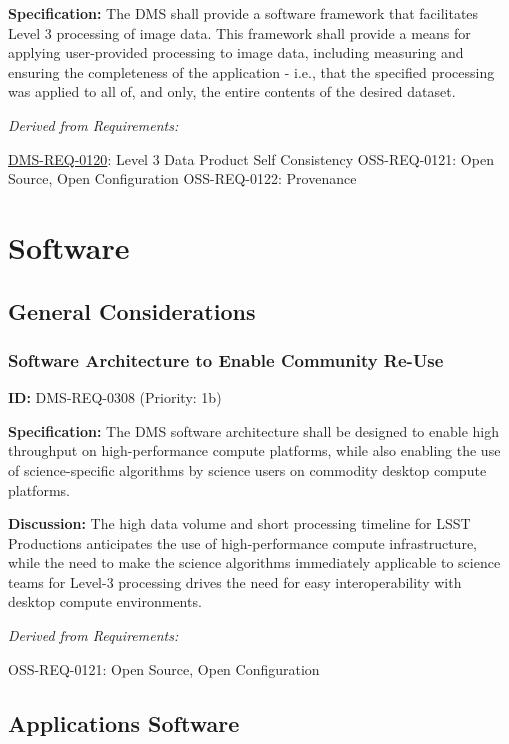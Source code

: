 \documentclass[SE,toc,lsstdraft]{lsstdoc}
\begin{document}
\textbf{Specification:} The DMS shall provide a software framework that facilitates Level 3 processing of image data.  This framework shall provide a means for applying user-provided processing to image data, including measuring and ensuring the completeness of the application - i.e., that the specified processing was applied to all of, and only, the entire contents of the desired dataset.

\emph{Derived from Requirements:}

\hyperref[DMS-REQ-0120]{DMS-REQ-0120}:
Level 3 Data Product Self Consistency \newline
OSS-REQ-0121:
Open Source, Open Configuration \newline
OSS-REQ-0122:
Provenance \newline

\section{Software}

\subsection{General Considerations}

\subsubsection{Software Architecture to Enable Community Re-Use}

\label{DMS-REQ-0308}
\textbf{ID:} DMS-REQ-0308 (Priority: 1b)

\textbf{Specification:} The DMS software architecture shall be designed to enable high throughput on high-performance compute platforms, while also enabling the use of science-specific algorithms by science users on commodity desktop compute platforms.

\textbf{Discussion: }The high data volume and short processing timeline for LSST Productions anticipates the use of high-performance compute infrastructure, while the need to make the science algorithms immediately applicable to science teams for Level-3 processing drives the need for easy interoperability with desktop compute environments.

\emph{Derived from Requirements:}

OSS-REQ-0121:
Open Source, Open Configuration \newline

\subsection{Applications Software}
\end{document}
